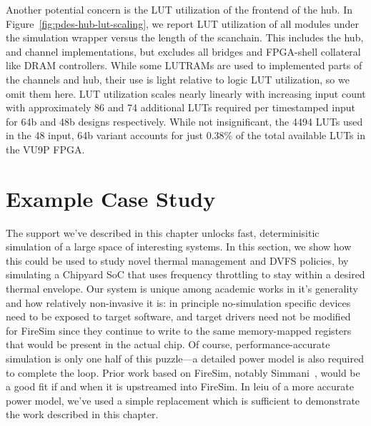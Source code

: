 Another potential concern is the LUT utilization of the frontend of the hub.
In Figure~\ref{fig:pdes-hub-lut-scaling}, we report LUT utilization of all
modules under the simulation wrapper versus the length of the scanchain. This
includes the hub, and channel implementations, but excludes all bridges and
FPGA-shell collateral like DRAM controllers. While some LUTRAMs are used to
implemented parts of the channels and hub, their use is light relative to logic
LUT utilization, so we omit them here. LUT utilization scales nearly linearly
with increasing input count with approximately 86 and 74 additional LUTs required per
timestamped input for 64b and 48b designs respectively. While not
insignificant, the 4494 LUTs used in the 48 input, 64b variant accounts for
just 0.38\% of the total available LUTs in the VU9P FPGA.

\section{Example Case Study}

The support we've described in this chapter unlocks fast, determinisitic
simulation of a large space of interesting systems. In this section, we show how this
could be used to study novel thermal management and DVFS policies, by
simulating a Chipyard SoC that uses frequency throttling to stay within a
desired thermal envelope. Our system is unique among academic works in it's generality and how 
relatively non-invasive it is: in principle no-simulation specific devices need
to be exposed to target software, and target drivers need not be modified for
FireSim since they continue to write to the same memory-mapped registers that
would be present in the actual chip. Of course, performance-accurate simulation is only
one half of this puzzle---a detailed power model is also required to complete
the loop. Prior work based on FireSim, notably Simmani~\cite{Simmani}, would be
a good fit if and when it is upstreamed into FireSim.  In leiu of a more
accurate power model, we've used a simple replacement which is sufficient to
demonstrate the work described in this chapter.

